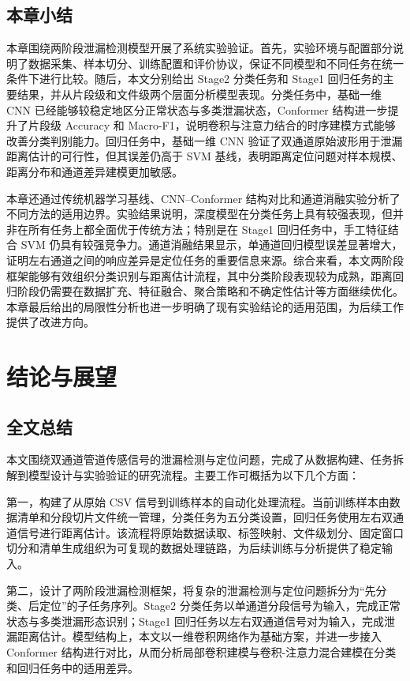 \section{本章小结}

本章围绕两阶段泄漏检测模型开展了系统实验验证。首先，实验环境与配置部分说明了数据采集、样本切分、训练配置和评价协议，保证不同模型和不同任务在统一条件下进行比较。随后，本文分别给出 Stage2 分类任务和 Stage1 回归任务的主要结果，并从片段级和文件级两个层面分析模型表现。分类任务中，基础一维 CNN 已经能够较稳定地区分正常状态与多类泄漏状态，Conformer 结构进一步提升了片段级 Accuracy 和 Macro-F1，说明卷积与注意力结合的时序建模方式能够改善分类判别能力。回归任务中，基础一维 CNN 验证了双通道原始波形用于泄漏距离估计的可行性，但其误差仍高于 SVM 基线，表明距离定位问题对样本规模、距离分布和通道差异建模更加敏感。

本章还通过传统机器学习基线、CNN--Conformer 结构对比和通道消融实验分析了不同方法的适用边界。实验结果说明，深度模型在分类任务上具有较强表现，但并非在所有任务上都全面优于传统方法；特别是在 Stage1 回归任务中，手工特征结合 SVM 仍具有较强竞争力。通道消融结果显示，单通道回归模型误差显著增大，证明左右通道之间的响应差异是定位任务的重要信息来源。综合来看，本文两阶段框架能够有效组织分类识别与距离估计流程，其中分类阶段表现较为成熟，距离回归阶段仍需要在数据扩充、特征融合、聚合策略和不确定性估计等方面继续优化。本章最后给出的局限性分析也进一步明确了现有实验结论的适用范围，为后续工作提供了改进方向。

\chapter{结论与展望}

\section{全文总结}

本文围绕双通道管道传感信号的泄漏检测与定位问题，完成了从数据构建、任务拆解到模型设计与实验验证的研究流程。主要工作可概括为以下几个方面：

第一，构建了从原始 CSV 信号到训练样本的自动化处理流程。当前训练样本由数据清单和分段切片文件统一管理，分类任务为五分类设置，回归任务使用左右双通道信号进行距离估计。该流程将原始数据读取、标签映射、文件级划分、固定窗口切分和清单生成组织为可复现的数据处理链路，为后续训练与分析提供了稳定输入。

第二，设计了两阶段泄漏检测框架，将复杂的泄漏检测与定位问题拆分为“先分类、后定位”的子任务序列。Stage2 分类任务以单通道分段信号为输入，完成正常状态与多类泄漏形态识别；Stage1 回归任务以左右双通道信号对为输入，完成泄漏距离估计。模型结构上，本文以一维卷积网络作为基础方案，并进一步接入 Conformer 结构进行对比，从而分析局部卷积建模与卷积-注意力混合建模在分类和回归任务中的适用差异。

